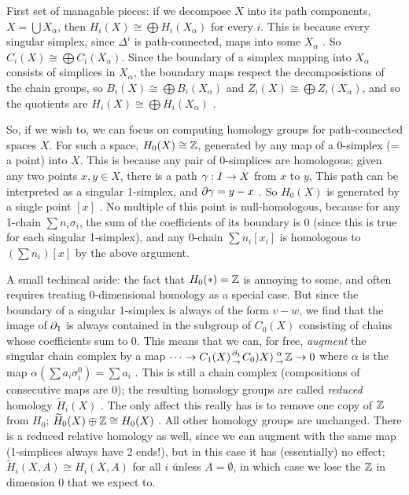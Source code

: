 \msk

First set of managable pieces: if we decompose $X$ into its path components, $X=\bigcup X_\alpha$,
then $H_i(X) \cong \bigoplus H_i(X_\alpha)$ for every $i$. This is because every singular simplex,
since $\Delta^i$ is path-connected, maps into some $X_\alpha$ . So $C_i(X) \cong \bigoplus C_i(X_\alpha)$.
Since the boundary of a simplex mapping into $X_\alpha$ consists of simplices in $X_\alpha$, the 
boundary maps respect the decomposistions of the chain groups, so 
$B_i(X) \cong \bigoplus B_i(X_\alpha)$ and $Z_i(X) \cong \bigoplus Z_i(X_\alpha)$, and so 
the quotients are $H_i(X) \cong \bigoplus H_i(X_\alpha)$ . 

\msk

So, if we wish to, we can focus on computing homology groups for path-connected spaces $X$. For such a space, 
$H_0(X)\cong {\Bbb Z}$, generated by any map of a 0-simplex (= a point) into $X$. This is because any pair
of 0-simplices are homologous; given any two points $x,y\in X$, there is a path $\gamma: I\rightarrow X$ from $x$ to $y$,
This path can be interpreted as a singular 1-simplex, and $\partial\gamma = y-x$ . So $H_0(X)$ is generated
by a single point $[x]$ . No multiple of this point is null-homologous, because for any 1-chain $\sum n_i \sigma_i$,
the sum of the coefficients of its boundary is 0 (since this is true for each singular 1-simplex), and any 0-chain
$\sum n_i [x_i]$ is homologous to $(\sum n_i)[x]$ by the above argument.

\msk

A small techincal aside: the fact that $H_0(*)={\Bbb Z}$ is annoying to some,
and often requires treating 0-dimensional homology as a special case. 
But since the boundary of a singular 1-simplex is always of the form $v-w$, we find that the 
image of $\partial_1$ is always contained in the subgroup of $C_0(X)$ consisting
of chains whose coefficients sum to 0. This means that we can, for free, 
{\it augment} the singular chain complex by a map
$\cdots \rightarrow C_1(X) {\partial_1\atop\rightarrow}C_0)X) {\alpha\atop \rightarrow} {\Bbb Z} \rightarrow 0$
where $\alpha$ is the map $\alpha(\sum a_i\sigma_i^0) = \sum a_i$ . This 
is still a chain complex (compositions of consecutive maps are 0); the resulting
homology groups are called {\it reduced} homology $\widetilde{H}_i(X)$ . 
The only affect this really has is to remove one copy of ${\Bbb Z}$ from 
$H_0$; $\widetilde{H}_0(X)\oplus {\Bbb Z} \cong H_0(X)$ . All other
homology groups are unchanged. There is a reduced relative homology 
as well, since we can augment with the same map (1-simplices always have 2 ends!),
but in this case it has (essentially) no effect; $\widetilde{H}_i(X,A)\cong H_i(X,A)$
for all $i$ \u{unless} $A=\emptyset$, in which case we lose the ${\Bbb Z}$ in
dimension 0 that we expect to. 

